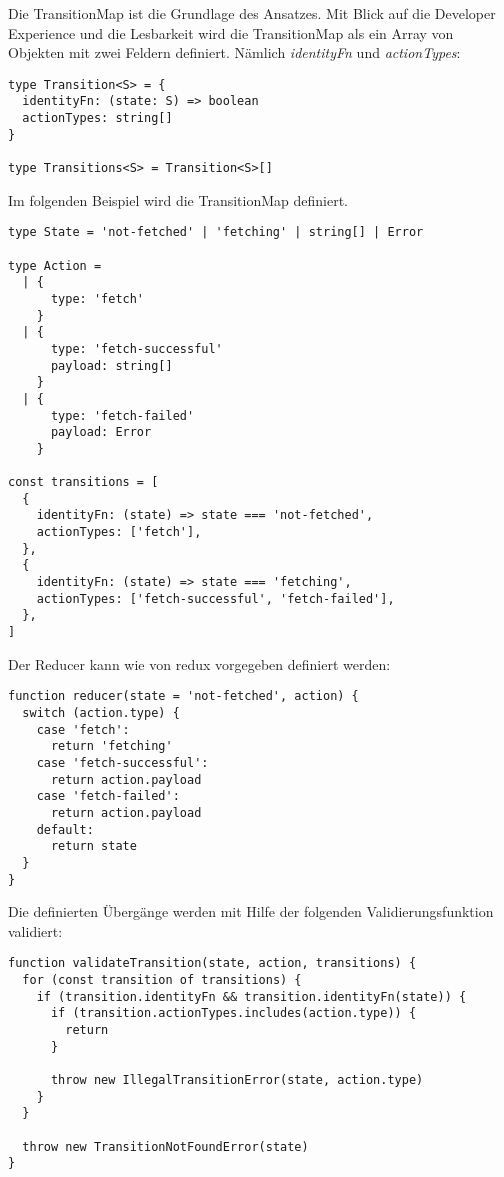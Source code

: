 Die TransitionMap ist die Grundlage des Ansatzes. Mit Blick auf die Developer Experience und die Lesbarkeit wird die TransitionMap als ein Array von Objekten mit zwei Feldern definiert. Nämlich \textit{identityFn} und \textit{actionTypes}:

\begin{lstlisting}
type Transition<S> = {
  identityFn: (state: S) => boolean
  actionTypes: string[]
}
  
type Transitions<S> = Transition<S>[]
\end{lstlisting}

Im folgenden Beispiel wird die TransitionMap definiert.

\begin{lstlisting}
type State = 'not-fetched' | 'fetching' | string[] | Error

type Action =
  | {
      type: 'fetch'
    }
  | {
      type: 'fetch-successful'
      payload: string[]
    }
  | {
      type: 'fetch-failed'
      payload: Error
    }
  
const transitions = [
  {
    identityFn: (state) => state === 'not-fetched',
    actionTypes: ['fetch'],
  },
  {
    identityFn: (state) => state === 'fetching',
    actionTypes: ['fetch-successful', 'fetch-failed'],
  },
]
\end{lstlisting}

Der Reducer kann wie von redux vorgegeben definiert werden:

\begin{lstlisting}
function reducer(state = 'not-fetched', action) {
  switch (action.type) {
    case 'fetch':
      return 'fetching'
    case 'fetch-successful':
      return action.payload
    case 'fetch-failed':
      return action.payload
    default:
      return state
  }
}
\end{lstlisting}

Die definierten Übergänge werden mit Hilfe der folgenden Validierungsfunktion validiert:

\begin{lstlisting}
function validateTransition(state, action, transitions) {
  for (const transition of transitions) {
    if (transition.identityFn && transition.identityFn(state)) {
      if (transition.actionTypes.includes(action.type)) {
        return
      }
  
      throw new IllegalTransitionError(state, action.type)
    }
  }
  
  throw new TransitionNotFoundError(state)
}
\end{lstlisting}

